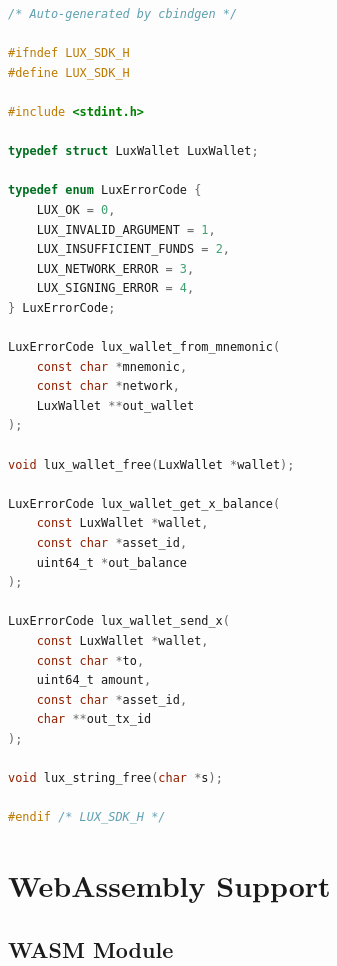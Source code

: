 \documentclass[11pt,twocolumn]{article}
\begin{document}
\begin{lstlisting}[language=C,caption=Generated Header]
/* Auto-generated by cbindgen */

#ifndef LUX_SDK_H
#define LUX_SDK_H

#include <stdint.h>

typedef struct LuxWallet LuxWallet;

typedef enum LuxErrorCode {
    LUX_OK = 0,
    LUX_INVALID_ARGUMENT = 1,
    LUX_INSUFFICIENT_FUNDS = 2,
    LUX_NETWORK_ERROR = 3,
    LUX_SIGNING_ERROR = 4,
} LuxErrorCode;

LuxErrorCode lux_wallet_from_mnemonic(
    const char *mnemonic,
    const char *network,
    LuxWallet **out_wallet
);

void lux_wallet_free(LuxWallet *wallet);

LuxErrorCode lux_wallet_get_x_balance(
    const LuxWallet *wallet,
    const char *asset_id,
    uint64_t *out_balance
);

LuxErrorCode lux_wallet_send_x(
    const LuxWallet *wallet,
    const char *to,
    uint64_t amount,
    const char *asset_id,
    char **out_tx_id
);

void lux_string_free(char *s);

#endif /* LUX_SDK_H */
\end{lstlisting}

\section{WebAssembly Support}

\subsection{WASM Module}
\end{document}
